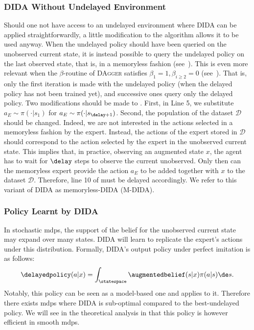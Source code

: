 \subsubsection{DIDA Without Undelayed Environment}
\label{subsubsec:dida_no_undelayed_env}
Should one not have access to an undelayed environment where DIDA can be applied straightforwardly, a little modification to the algorithm allows it to be used anyway. 
When the undelayed policy should have been queried on the unobserved current state, it is instead possible to query the undelayed policy on the last observed state, that is, in a memoryless fashion (see~). 
This is even more relevant when the $\beta$-routine of \textsc{DAgger} satisfies $\beta_1=1, \beta_{i\ge 2}=0$ (see~). 
That is, only the first iteration is made with the undelayed policy (when the delayed policy has not been trained yet), and successive ones query only the delayed policy.
Two modifications should be made to .
First, in Line 5, we substitute $a_E\sim\pi(\cdot\vert s_{1})$ for $a_E\sim\pi(\cdot\vert s_{\delay+1})$.
Second, the population of the dataset $\mathcal{D}$ should be changed. 
Indeed, we are not interested in the actions selected in a memoryless fashion by the expert. 
Instead, the actions of the expert stored in $\mathcal{D}$ should correspond to the action selected by the expert in the unobserved current state. 
This implies that, in practice, observing an augmented state $x$, the agent has to wait for $\delay$ steps to observe the current unobserved.
Only then can the memoryless expert provide the action $a_E$ to be added together with $x$ to the dataset $\mathcal{D}$. 
Therefore, line 10 of  must be delayed accordingly.
We refer to this variant of DIDA as memoryless-DIDA (M-DIDA).


\subsubsection{Policy Learnt by DIDA}
In stochastic \glspl{mdp}, the support of the belief for the unobserved current state may expand over many states. DIDA will learn to replicate the expert's actions under this distribution. 
Formally, DIDA's output policy under perfect imitation is as follows: 
\begin{align}
    \delayedpolicy(a\vert x) = \int_{\statespace} \augmentedbelief(s\vert x) \pi(a\vert s)\de s.\label{eq:belief_pol}
\end{align}
Notably, this policy can be seen as a model-based one and   applies to it. Therefore there exists \glspl{mdp} where DIDA is sub-optimal compared to the best-undelayed policy. We will see in the theoretical analysis in  that this policy is however efficient in smooth \glspl{mdp}.

